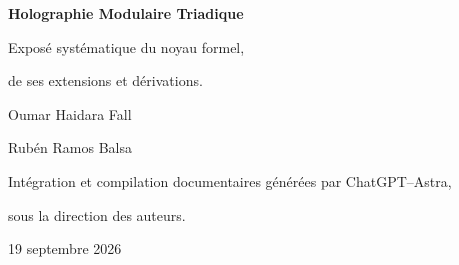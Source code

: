\hypersetup{pageanchor=false}
\begin{titlepage}
\thispagestyle{empty}
\centering
\vspace*{2.9cm}
{\fontsize{27}{34}\selectfont\bfseries Holographie Modulaire Triadique\par}
\vspace{1.1cm}
{\fontsize{16}{22}\selectfont Exposé systématique du noyau formel,\par
de ses extensions et dérivations.\par}
\vspace{2cm}
{\large Oumar Haidara Fall\par}
\vspace{.35cm}
{\large Rubén Ramos Balsa\par}
\vfill
{\small Intégration et compilation documentaires générées par ChatGPT--Astra,\par
sous la direction des auteurs.\par}
\vspace{1.1cm}
{\small 19 septembre 2026\par}
\end{titlepage}
\hypersetup{pageanchor=true}
